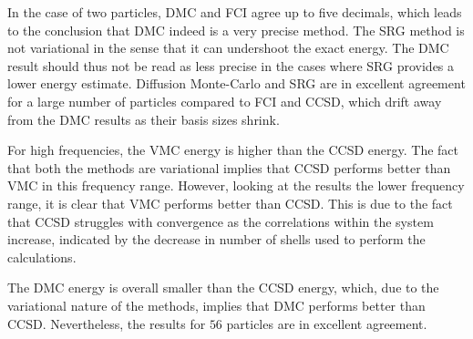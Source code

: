 In the case of two particles, DMC and FCI agree up to five decimals, which leads to the conclusion that DMC indeed is a very precise method. The SRG method is not variational in the sense that it can undershoot the exact energy. The DMC result should thus not be read as less precise in the cases where SRG provides a lower energy estimate. Diffusion Monte-Carlo and SRG are in excellent agreement for a large number of particles compared to FCI and CCSD, which drift away from the DMC results as their basis sizes shrink. 

For high frequencies, the VMC energy is higher than the CCSD energy. The fact that both the methods are variational implies that CCSD performs better than VMC in this frequency range. However, looking at the results the lower frequency range, it is clear that VMC performs better than CCSD. This is due to the fact that CCSD struggles with convergence as the correlations within the system increase, indicated by the decrease in number of shells used to perform the calculations.

The DMC energy is overall smaller than the CCSD energy, which, due to the variational nature of the methods, implies that DMC performs better than CCSD. Nevertheless, the results for $56$ particles are in excellent agreement. 

